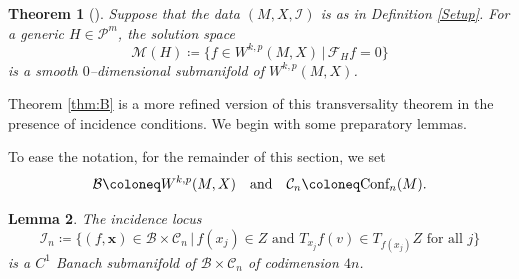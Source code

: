 \documentclass[11pt,a4paper]{article}
\newtheorem{theorem}{Theorem}[section]
\newtheorem{lemma}[theorem]{Lemma}
\theoremstyle{definition}
\newcommand{\Conf}{\textnormal{Conf}}
\newcommand{\eand}{\quad \text{and} \quad}
\newcommand{\cC}{\mathcal{C}}
\newcommand{\cF}{\mathcal{F}}
\newcommand{\cI}{\mathcal{I}}
\newcommand{\cP}{\mathcal{P}}
\newcommand{\cM}{\mathcal{M}}
\newcommand{\cB}{\mathcal{B}}
\newcommand{\bx}{\mathbf{x}}
\begin{document}
\begin{theorem}[{\cite[Theorem 4.1]{HNS09}}]
  Suppose that the data $(M, X, \cI)$ is as in Definition \ref{Setup}. For a generic $H \in \cP^m$, the solution space
  \begin{equation*}
    \cM(H) \coloneq \{ f \in W^{k, p}(M, X) \,| \, \cF_H f = 0 \} 
  \end{equation*}
  is a smooth $0$--dimensional submanifold of $W^{k, p}(M, X)$.
\end{theorem}

Theorem \ref{thm:B} is a more refined version of this transversality theorem in the presence of incidence conditions. We begin with some preparatory lemmas. 

To ease the notation, for the remainder of this section, we set
\begin{equation*}
  \cB \coloneq W^{k, p}(M, X) \eand \cC_n \coloneq \Conf_n(M).
\end{equation*}

\begin{lemma}\label{incidence locus}
  The incidence locus 
  \begin{equation*}
    \cI_n \coloneq \{ (f, \bx) \in \cB \times \cC_n \, | \, f(x_j) \in Z \text{ and } T_{x_j}f(v) \in T_{f(x_j)}Z \text{ for all } j\}
  \end{equation*}
  is a $C^1$ Banach submanifold of $\cB \times \cC_n$ of codimension $4n$.
\end{lemma}
\end{document}
